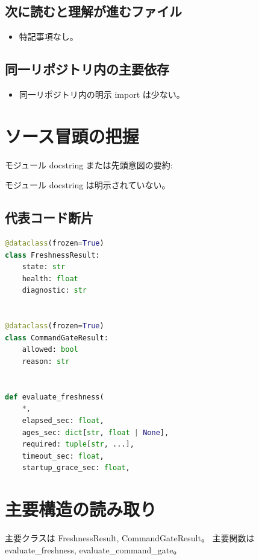 \documentclass[a4paper,11pt]{article}
\begin{document}
        \subsection{次に読むと理解が進むファイル}
        \begin{itemize}[leftmargin=1.6em]
        \item 特記事項なし。
        \end{itemize}

        \subsection{同一リポジトリ内の主要依存}
        \begin{itemize}[leftmargin=1.6em]
        \item 同一リポジトリ内の明示 import は少ない。
        \end{itemize}

        \section{ソース冒頭の把握}
        モジュール docstring または先頭意図の要約:

        モジュール docstring は明示されていない。

        \subsection{代表コード断片}
        \begin{lstlisting}[language=Python]
@dataclass(frozen=True)
class FreshnessResult:
    state: str
    health: float
    diagnostic: str


@dataclass(frozen=True)
class CommandGateResult:
    allowed: bool
    reason: str


def evaluate_freshness(
    *,
    elapsed_sec: float,
    ages_sec: dict[str, float | None],
    required: tuple[str, ...],
    timeout_sec: float,
    startup_grace_sec: float,
\end{lstlisting}


        \section{主要構造の読み取り}
        主要クラスは FreshnessResult, CommandGateResult。 主要関数は evaluate\_freshness, evaluate\_command\_gate。
\end{document}
